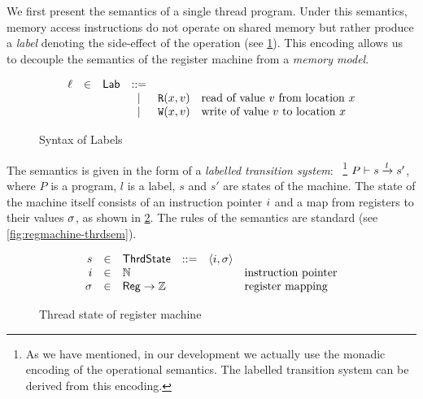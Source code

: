 We first present the semantics of a single thread program.
Under this semantics, memory access instructions 
do not operate on shared memory
but rather produce a \emph{label}
denoting the side-effect of the operation 
(see \cref{fig:label-syntax}).
This encoding allows us to decouple 
the semantics of the register machine 
from a \emph{memory model}.

\begin{figure}[h!]
\[
\begin{array}{rclclll}

  \ell &\in& \mathsf{Lab}  &::=&                                & \text{}             \\
              & &  & | & {\mathtt{R}}({x},{v})                    & \text{read of value $v$ from location $x$}   \\
              & &  & | & {\mathtt{W}}({x},{v})                    & \text{write of value $v$ to location $x$}    \\

\end{array}
\] 
\caption{Syntax of Labels}
\label{fig:label-syntax}
\end{figure}

The semantics is given in the form of a
\emph{labelled transition system}:~%
\footnote{As we have mentioned, in our \coq development we actually use 
the monadic encoding of the operational semantics. 
The labelled transition system can be derived from this encoding.}
$P \vdash s \xrightarrow{l} s'$,
where $P$ is a program, $l$ is a label, $s$ and $s'$ are states of the machine. 
The state of the machine itself consists of an instruction pointer $i$
and a map from registers to their values $\sigma$, 
as shown in \cref{fig:regmachine-thrdstate}. 
The rules of the semantics are standard 
(see \cref{fig:regmachine-thrdsem}).

\begin{figure}[h!]
\[
\begin{array}{rclclll}

  s          &\in& \mathsf{ThrdState}    &::=& \langle i, \sigma \rangle &                         \\
  i     &\in& {\mathbb{N}}            &   &                    & \text{instruction pointer} \\
  \sigma    &\in& \mathsf{Reg} \rightarrow {\mathbb{Z}}  &   &                    & \text{register mapping}   \\

\end{array}
\] 
\caption{Thread state of register machine}
\label{fig:regmachine-thrdstate}
\end{figure}



